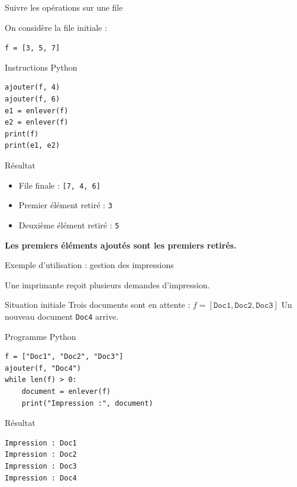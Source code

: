 \documentclass[10pt]{beamer}
\begin{document}
\begin{frame}[fragile]{Suivre les opérations sur une file}

On considère la file initiale :

\begin{center}
\texttt{f = [3, 5, 7]}
\end{center}

\medskip

\begin{exampleblock}{Instructions Python}
\begin{lstlisting}
ajouter(f, 4)
ajouter(f, 6)
e1 = enlever(f)
e2 = enlever(f)
print(f)
print(e1, e2)
\end{lstlisting}
\end{exampleblock}

\pause

\begin{block}{Résultat}
\begin{itemize}
    \item File finale : \texttt{[7, 4, 6]}
    \item Premier élément retiré : \texttt{3}
    \item Deuxième élément retiré : \texttt{5}
\end{itemize}
\end{block}

\medskip

\begin{center}
\textbf{Les premiers éléments ajoutés sont les premiers retirés.}
\end{center}

\end{frame}
\begin{frame}[fragile]{Exemple d'utilisation : gestion des impressions}

Une imprimante reçoit plusieurs demandes d'impression.



\begin{exampleblock}{Situation initiale}
Trois documents sont en attente :
$
f = [\texttt{Doc1},\texttt{Doc2},\texttt{Doc3}]
$
Un nouveau document \texttt{Doc4} arrive.
\end{exampleblock}

\medskip

\begin{block}{Programme Python}
\begin{lstlisting}
f = ["Doc1", "Doc2", "Doc3"]
ajouter(f, "Doc4")
while len(f) > 0:
    document = enlever(f)
    print("Impression :", document)
\end{lstlisting}
\end{block}

\pause

\begin{exampleblock}{Résultat}
\begin{verbatim}
Impression : Doc1
Impression : Doc2
Impression : Doc3
Impression : Doc4
\end{verbatim}
\end{exampleblock}

\end{frame}
\end{document}
